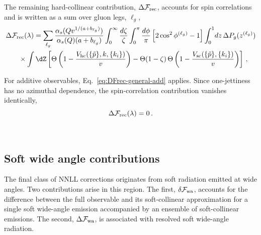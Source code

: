 The remaining hard-collinear contribution,
$\Delta\mathcal{F}_{\rm rec}$, accounts for spin correlations and is
written as a sum over gluon legs, $\ell_g$,
\begin{equation}
\label{eq:DFrec-general}
\begin{aligned}
  \Delta&\mathcal{F}_{\mathrm{rec}}(\lambda) =
\sum_{\ell_g}\frac{\alpha_s(Qv^{1/(a+b_{\ell_g})})}{\alpha_s(Q)(a+b_{\ell_g})}\int_0^\infty \frac{d\zeta}{\zeta}
\int_0^\pi \frac{d\phi}{\pi}\left[2\cos^2\phi^{(\ell_g)} - 1\right]
\int_0^1\!dz\,
\Delta P_g(z^{(\ell_g)})
\\
&\quad \times \int \dZ \left[
\Theta\left(1 - \frac{V_{\mathrm{hc}}(\{\tilde{p}\},k,\{k_i\})}{v}\right)
- \Theta(1-\zeta)\,
\Theta\left(1 - \frac{V_{\mathrm{sc}}(\{\tilde{p}\},\{k_i\})}{v}\right)
\right]\,,
\end{aligned}
\end{equation}

For additive observables, Eq.~\eqref{eq:DFrec-general-add} applies.
Since one-jettiness has no azimuthal dependence,
 the spin-correlation contribution vanishes identically,
\begin{equation}
\Delta\mathcal{F}_{\rm rec}(\lambda)=0\,.
\end{equation}

 \\

\subsection{Soft wide angle contributions}
\label{sec:wa-contributions}

The final class of NNLL corrections originates from soft radiation
emitted at wide angles. Two contributions arise in this region.
The first, $\delta\mathcal{F}_{\rm wa}$, accounts for the difference
between the full observable and its soft-collinear approximation for a
single soft wide-angle emission accompanied by an ensemble of
soft-collinear emissions. The second,
$\Delta\mathcal{F}_{\rm wa}$, is associated with resolved soft
wide-angle radiation.

